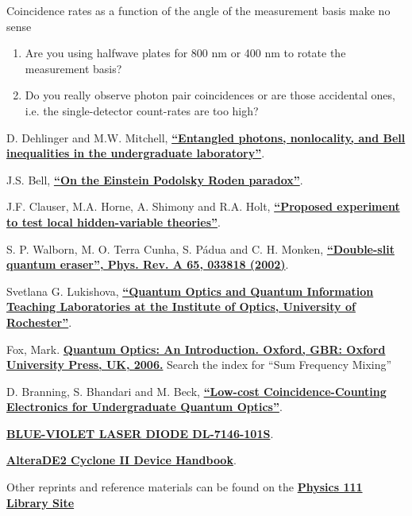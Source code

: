 \documentclass{../lab}
\begin{document}
\noindent Coincidence rates as a function of the angle of the measurement basis make no sense

\begin{enumerate}
    \item Are you using halfwave plates for 800 nm or 400 nm to rotate the measurement basis?

    \item Do you really observe photon pair coincidences or are those accidental ones, i.e. the single-detector count-rates are too high?
\end{enumerate}

\begin{thebibliography}{}
\label{sec:References}
    D. Dehlinger and M.W. Mitchell, \href{http://physics111.lib.berkeley.edu/Physics111/Reprints/QIE/Entangled\%20Photons-M.W.\%20Mitchell_1.1498860.pdf}{\textbf{``Entangled photons, nonlocality, and Bell inequalities in the undergraduate laboratory''}}.

    J.S. Bell, \href{http://physics111.lib.berkeley.edu/Physics111/Reprints/QIE/Bell_Compact.pdf}{\textbf{``On the Einstein Podolsky Roden paradox''}}.

    J.F. Clauser, M.A. Horne, A. Shimony and R.A. Holt, \href{http://physics111.lib.berkeley.edu/Physics111/Reprints/QIE/Proposed\%20Experiment\%20To\%20Test\%20Local\%20Hidden-variable\%20Theories-PhysRevLett.23.880.pdf}{\textbf{``Proposed experiment to test local hidden-variable theories''}}.

    S. P. Walborn, M. O. Terra Cunha, S. Pádua and C. H. Monken, \href{http://physics111.lib.berkeley.edu/Physics111/Reprints/QIE/Quantum-Eraser-Walborn.pdf}{\textbf{``Double-slit quantum eraser'', Phys. Rev. A 65, 033818 (2002)}}.
    
    Svetlana G. Lukishova, \href{http://physics111.lib.berkeley.edu/Physics111/Reprints/QIE/TULSA_2010_Talk_Lukishova.pdf}{\textbf{``Quantum Optics and Quantum Information Teaching Laboratories at the Institute of Optics, University of Rochester''}}.

    Fox, Mark. \href{http://physics111.lib.berkeley.edu/Physics111/Reprints/QIE/Mark\%20Fox_Quantum\%20Optics\%20An\%20Introduction.pdf}{\textbf{Quantum Optics: An Introduction.  Oxford, GBR: Oxford University Press, UK, 2006.}} Search the index for ``Sum Frequency Mixing''
    
    D. Branning, S. Bhandari and M. Beck, \href{http://physics111.lib.berkeley.edu/Physics111/Reprints/QIE/CCU_ajp_09.pdf}{\textbf{``Low-cost Coincidence-Counting Electronics for Undergraduate Quantum Optics''}}.
    
    \href{http://physics111.lib.berkeley.edu/Physics111/Reprints/QIE/Sanyo-7146-101S.pdf}{\textbf{BLUE-VIOLET LASER DIODE DL-7146-101S}}.
    
    \href{http://physics111.lib.berkeley.edu/Physics111/Reprints/QIE/AlteraDE2}{\textbf{AlteraDE2 Cyclone II Device Handbook}}.

\end{thebibliography}

\vspace{1em}

\noindent Other reprints and reference materials can be found on the \href{\LabReprints}{\textbf{Physics 111 Library Site}}
\end{document}
